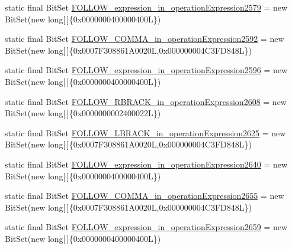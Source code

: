 \begin{DoxyCompactItemize}
\item 
static final Bit\-Set \hyperlink{classorg_1_1tzi_1_1use_1_1parser_1_1shell_1_1_shell_command_parser_a77c08802734527c3951789603382c3c9}{F\-O\-L\-L\-O\-W\-\_\-expression\-\_\-in\-\_\-operation\-Expression2579} = new Bit\-Set(new long\mbox{[}$\,$\mbox{]}\{0x0000000400000400\-L\})
\item 
static final Bit\-Set \hyperlink{classorg_1_1tzi_1_1use_1_1parser_1_1shell_1_1_shell_command_parser_a7d648d6bb83279218deccfcf55b3295e}{F\-O\-L\-L\-O\-W\-\_\-\-C\-O\-M\-M\-A\-\_\-in\-\_\-operation\-Expression2592} = new Bit\-Set(new long\mbox{[}$\,$\mbox{]}\{0x0007\-F308861\-A0020\-L,0x000000004\-C3\-F\-D848\-L\})
\item 
static final Bit\-Set \hyperlink{classorg_1_1tzi_1_1use_1_1parser_1_1shell_1_1_shell_command_parser_ab225f1fc20fd8fa78ed4a1fd73e80cf4}{F\-O\-L\-L\-O\-W\-\_\-expression\-\_\-in\-\_\-operation\-Expression2596} = new Bit\-Set(new long\mbox{[}$\,$\mbox{]}\{0x0000000400000400\-L\})
\item 
static final Bit\-Set \hyperlink{classorg_1_1tzi_1_1use_1_1parser_1_1shell_1_1_shell_command_parser_a4daee05c2ab429e0964499ceb6ca13e3}{F\-O\-L\-L\-O\-W\-\_\-\-R\-B\-R\-A\-C\-K\-\_\-in\-\_\-operation\-Expression2608} = new Bit\-Set(new long\mbox{[}$\,$\mbox{]}\{0x0000000002400022\-L\})
\item 
static final Bit\-Set \hyperlink{classorg_1_1tzi_1_1use_1_1parser_1_1shell_1_1_shell_command_parser_ab5758e23ab9eeabf31d22f156767a2ad}{F\-O\-L\-L\-O\-W\-\_\-\-L\-B\-R\-A\-C\-K\-\_\-in\-\_\-operation\-Expression2625} = new Bit\-Set(new long\mbox{[}$\,$\mbox{]}\{0x0007\-F308861\-A0020\-L,0x000000004\-C3\-F\-D848\-L\})
\item 
static final Bit\-Set \hyperlink{classorg_1_1tzi_1_1use_1_1parser_1_1shell_1_1_shell_command_parser_ab12c388037b53de632e141621e9f9ce5}{F\-O\-L\-L\-O\-W\-\_\-expression\-\_\-in\-\_\-operation\-Expression2640} = new Bit\-Set(new long\mbox{[}$\,$\mbox{]}\{0x0000000400000400\-L\})
\item 
static final Bit\-Set \hyperlink{classorg_1_1tzi_1_1use_1_1parser_1_1shell_1_1_shell_command_parser_a4dd1033671446eb99b7176d0f01c8a26}{F\-O\-L\-L\-O\-W\-\_\-\-C\-O\-M\-M\-A\-\_\-in\-\_\-operation\-Expression2655} = new Bit\-Set(new long\mbox{[}$\,$\mbox{]}\{0x0007\-F308861\-A0020\-L,0x000000004\-C3\-F\-D848\-L\})
\item 
static final Bit\-Set \hyperlink{classorg_1_1tzi_1_1use_1_1parser_1_1shell_1_1_shell_command_parser_adc7849b258a059b3ac017d5a64d03091}{F\-O\-L\-L\-O\-W\-\_\-expression\-\_\-in\-\_\-operation\-Expression2659} = new Bit\-Set(new long\mbox{[}$\,$\mbox{]}\{0x0000000400000400\-L\})

\end{DoxyCompactItemize}
